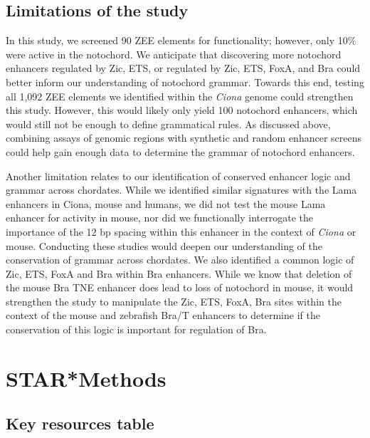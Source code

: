 \subsection{Limitations of the study}

In this study, we screened 90 ZEE elements for functionality; however, only 10\% were active in the notochord. We anticipate that discovering more notochord enhancers regulated by Zic, ETS, or regulated by Zic, ETS, FoxA, and Bra could better inform our understanding of notochord grammar. Towards this end, testing all 1,092 ZEE elements we identified within the \textit{Ciona} genome could strengthen this study. However, this would likely only yield 100 notochord enhancers, which would still not be enough to define grammatical rules. As discussed above, combining assays of genomic regions with synthetic and random enhancer screens could help gain enough data to determine the grammar of notochord enhancers. 

Another limitation relates to our identification of conserved enhancer logic and grammar across chordates. While we identified similar signatures with the Lama enhancers in Ciona, mouse and humans, we did not test the mouse Lama enhancer for activity in mouse, nor did we functionally interrogate the importance of the 12 bp spacing within this enhancer in the context of \textit{Ciona} or mouse. Conducting these studies would deepen our understanding of the conservation of grammar across chordates. We also identified a common logic of Zic, ETS, FoxA and Bra within Bra enhancers. While we know that deletion of the mouse Bra TNE enhancer does lead to loss of notochord in mouse, it would strengthen the study to manipulate the Zic, ETS, FoxA, Bra sites within the context of the mouse and zebrafish Bra/T enhancers to determine if the conservation of this logic is important for regulation of Bra.

\section{STAR*Methods}

\subsection{Key resources table}

